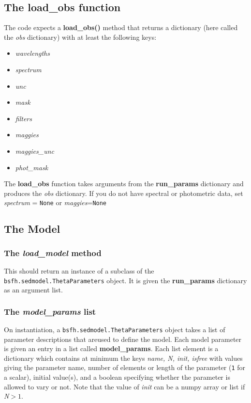 \subsection{The {\bf load_obs} function}
The code expects a {\bf load_obs()} method that returns a dictionary
(here called the {\it obs} dictionary) with at least the following
keys:
\begin{itemize}
\item {\it wavelengths}
\item {\it spectrum}
\item {\it unc}
\item {\it mask}
\item {\it filters}
\item {\it maggies}
\item {\it maggies_unc}
\item {\it phot_mask}
\end{itemize}

The {\bf load_obs} function takes arguments from the {\bf run_params}
dictionary and produces the {\it obs} dictionary.  If you do not have
spectral or photometric data, set {\it spectrum} = \texttt{None} or
{\it maggies}=\texttt{None}

\subsection{The Model}

\subsubsection{The \emph{load_model} method}
This should return an instance of a subclass of the
\texttt{bsfh.sedmodel.ThetaParameters} object.  It is given the {\bf
run_params} dictionary as an argument list.

\subsubsection{ The \emph{model_params} list}
On instantiation, a \texttt{bsfh.sedmodel.ThetaParameters} object
takes a list of parameter descriptions that areused to define the
model.  Each model parameter is given an entry in a list called {\bf
model_params}. Each list element is a dictionary which contains at
minimum the keys {\it name, N, init, isfree} with values giving the
parameter name, number of elements or length of the parameter
(\texttt{1} for a scalar), initial value(s), and a boolean specifying
whether the parameter is allowed to vary or not.  Note that the value
of {\it init} can be a numpy array or list if {\it N}$>1$.


